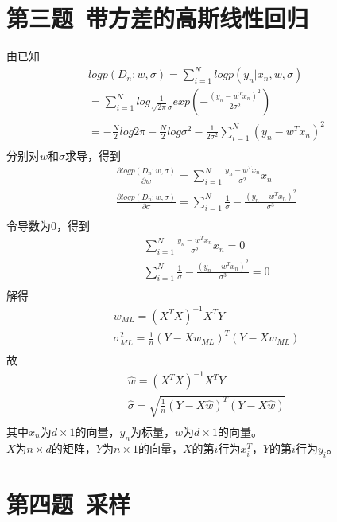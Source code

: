 \documentclass[12pt,a4paper]{article}
\begin{document}
\section{第三题\ 带方差的高斯线性回归}
由已知
\begin{gather*}
    logp(D_n;w,\sigma ) = \sum_{i = 1}^{N}logp(y_n|x_n,w,\sigma )\\
    =\sum_{i = 1}^{N}log\frac{1}{\sqrt{2\pi}\sigma}exp(-\frac{(y_n-w^Tx_n)^2}{2\sigma^2})\\
    =-\frac{N}{2}log2\pi-\frac{N}{2}log\sigma^2-\frac{1}{2\sigma^2}\sum_{i = 1}^{N}(y_n-w^Tx_n)^2\\
\end{gather*}
分别对$w$和$\sigma$求导，得到
\begin{gather*}
    \frac{\partial logp(D_n;w,\sigma )}{\partial w} = \sum_{i = 1}^{N}\frac{y_n-w^Tx_n}{\sigma^2}x_n\\
    \frac{\partial logp(D_n;w,\sigma )}{\partial \sigma} = \sum_{i = 1}^{N}\frac{1}{\sigma}-\frac{(y_n-w^Tx_n)^2}{\sigma^3}\\
\end{gather*}
令导数为0，得到
\begin{gather*}
    \sum_{i = 1}^{N}\frac{y_n-w^Tx_n}{\sigma^2}x_n=0\\
    \sum_{i = 1}^{N}\frac{1}{\sigma}-\frac{(y_n-w^Tx_n)^2}{\sigma^3}=0\\
\end{gather*}
解得
\begin{gather*}
    w_{ML}=(X^TX)^{-1}X^TY\\
    \sigma_{ML}^2=\frac{1}{n}(Y-Xw_{ML})^T(Y-Xw_{ML})\\
\end{gather*}
故
\begin{gather*}
    \hat{w}=(X^TX)^{-1}X^TY\\
    \hat{\sigma} = \sqrt{\frac{1}{n}(Y-X\hat{w})^T(Y-X\hat{w})}\\
\end{gather*}
其中$x_n$为$d\times 1$的向量，$y_n$为标量，$w$为$d\times 1$的向量。\\
$X$为$n\times d$的矩阵，$Y$为$n\times 1$的向量，$X$的第$i$行为$x_i^T$，$Y$的第$i$行为$y_i$。
\section{第四题\ 采样}
\end{document}
